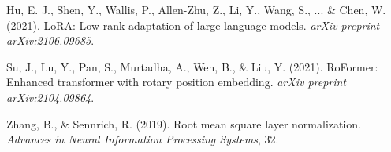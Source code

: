\documentclass[11pt,a4paper]{article}
\begin{document}
\begin{thebibliography}{9}

Hu, E. J., Shen, Y., Wallis, P., Allen-Zhu, Z., Li, Y., Wang, S., ... \& Chen, W. (2021).
\newblock LoRA: Low-rank adaptation of large language models.
\newblock \textit{arXiv preprint arXiv:2106.09685}.

Su, J., Lu, Y., Pan, S., Murtadha, A., Wen, B., \& Liu, Y. (2021).
\newblock RoFormer: Enhanced transformer with rotary position embedding.
\newblock \textit{arXiv preprint arXiv:2104.09864}.

Zhang, B., \& Sennrich, R. (2019).
\newblock Root mean square layer normalization.
\newblock \textit{Advances in Neural Information Processing Systems}, 32.

\end{thebibliography}
\end{document}
